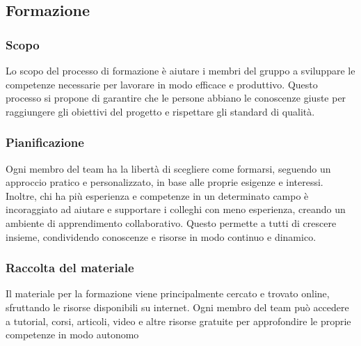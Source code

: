 \subsection{Formazione}
\subsubsection{Scopo}
Lo scopo del processo di formazione è aiutare i membri del gruppo a sviluppare le competenze necessarie per lavorare in modo efficace e produttivo. Questo processo si propone di garantire che le persone abbiano le conoscenze giuste per raggiungere gli obiettivi del progetto e rispettare gli standard di qualità.

\subsubsection{Pianificazione}
Ogni membro del team ha la libertà di scegliere come formarsi, seguendo un approccio pratico e personalizzato, in base alle proprie esigenze e interessi. Inoltre, chi ha più esperienza e competenze in un determinato campo è incoraggiato ad aiutare e supportare i colleghi con meno esperienza, creando un ambiente di apprendimento collaborativo. Questo permette a tutti di crescere insieme, condividendo conoscenze e risorse in modo continuo e dinamico.

\subsubsection{Raccolta del materiale}
Il materiale per la formazione viene principalmente cercato e trovato online, sfruttando le risorse disponibili su internet. Ogni membro del team può accedere a tutorial, corsi, articoli, video e altre risorse gratuite per approfondire le proprie competenze in modo autonomo